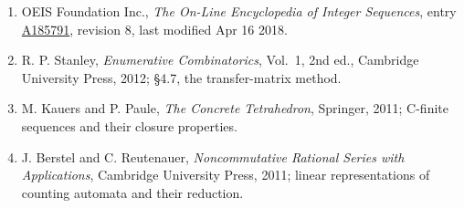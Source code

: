 \documentclass[11pt]{article}
\theoremstyle{definition}
\begin{document}
\begin{enumerate}

\item OEIS Foundation Inc., \emph{The On-Line Encyclopedia of Integer Sequences}, entry \href{https://oeis.org/A185791}{A185791}, revision 8, last modified Apr 16 2018.

\item R. P. Stanley, \emph{Enumerative Combinatorics}, Vol.~1, 2nd ed., Cambridge University Press, 2012; \S4.7, the transfer-matrix method.

\item M. Kauers and P. Paule, \emph{The Concrete Tetrahedron}, Springer, 2011; C-finite sequences and their closure properties.

\item J. Berstel and C. Reutenauer, \emph{Noncommutative Rational Series with Applications}, Cambridge University Press, 2011; linear representations of counting automata and their reduction.

\end{enumerate}
\end{document}
